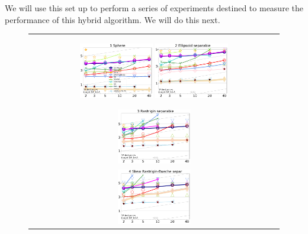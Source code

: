 \documentclass[runningheads]{llncs}
\begin{document}
We will use this set up to perform a series of experiments destined to
measure the performance of this hybrid algorithm. We will do this next.

\begin{figure}[h!tb]
  \begin{tabular}
      {c@{\hspace*{-0.00001\textwidth}}
      }
     
  \includegraphics[width=0.30\textwidth]{ppfigs_f001}
  \includegraphics[width=0.30\textwidth]{ppfigs_f002}

  \includegraphics[width=0.30\textwidth]{ppfigs_f003}\\
  \includegraphics[width=0.30\textwidth]{ppfigs_f004}
  

\end{tabular}
\end{figure}
\end{document}
